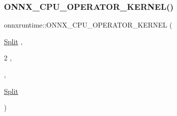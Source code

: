 \subsubsection{\texorpdfstring{O\+N\+N\+X\+\_\+\+C\+P\+U\+\_\+\+O\+P\+E\+R\+A\+T\+O\+R\+\_\+\+K\+E\+R\+N\+E\+L()}{ONNX\_CPU\_OPERATOR\_KERNEL()}\hspace{0.1cm}{\footnotesize\ttfamily [18/72]}}
{\footnotesize\ttfamily onnxruntime\+::\+O\+N\+N\+X\+\_\+\+C\+P\+U\+\_\+\+O\+P\+E\+R\+A\+T\+O\+R\+\_\+\+K\+E\+R\+N\+EL (\begin{DoxyParamCaption}\item[{\mbox{\hyperlink{classonnxruntime_1_1Split}{Split}}}]{,  }\item[{2}]{,  }\item[{\mbox{\hyperlink{classonnxruntime_1_1KernelDefBuilder}{Kernel\+Def\+Builder}}().Type\+Constraint(\char`\"{}T\char`\"{}, std\+::vector$<$ \mbox{\hyperlink{namespaceonnxruntime_ad77d0a6e838ec7da5dc35fed5ee66b49}{M\+L\+Data\+Type}} $>$\{ \mbox{\hyperlink{classonnxruntime_1_1DataTypeImpl_a7c4a6a7126bc7661eb67af6dfcfad1fb}{Data\+Type\+Impl\+::\+Get\+Tensor\+Type}}$<$ float $>$(), \mbox{\hyperlink{classonnxruntime_1_1DataTypeImpl_a7c4a6a7126bc7661eb67af6dfcfad1fb}{Data\+Type\+Impl\+::\+Get\+Tensor\+Type}}$<$ double $>$(), \})}]{,  }\item[{\mbox{\hyperlink{classonnxruntime_1_1Split}{Split}}}]{ }\end{DoxyParamCaption})}

\mbox{\label{namespaceonnxruntime_a4e8d7eecbd748f9887ff263164842d6e}} 
